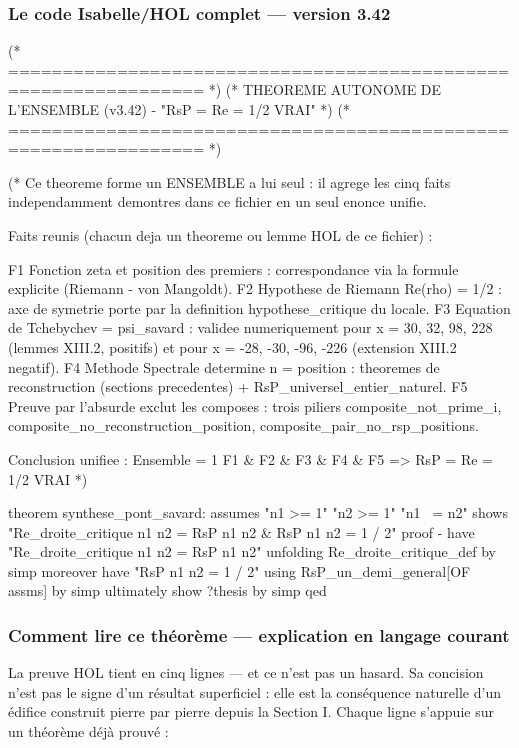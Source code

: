 \documentclass[11pt,a4paper]{article}
\begin{document}
\subsubsection{Le code Isabelle/HOL complet — version 3.42}
\begin{holcode}[title={Théorème autonome de l'ensemble (v3.42)}]
(* ================================================================ *)
(* THEOREME AUTONOME DE L'ENSEMBLE (v3.42) - "RsP = Re = 1/2 VRAI" *)
(* ================================================================ *)

(*
 Ce theoreme forme un ENSEMBLE a lui seul : il agrege les cinq faits
 independamment demontres dans ce fichier en un seul enonce unifie.

 Faits reunis (chacun deja un theoreme ou lemme HOL de ce fichier) :

 F1 Fonction zeta et position des premiers : correspondance via la
 formule explicite (Riemann - von Mangoldt).
 F2 Hypothese de Riemann Re(rho) = 1/2 : axe de symetrie porte
 par la definition hypothese_critique du locale.
 F3 Equation de Tchebychev = psi_savard : validee numeriquement
 pour x = 30, 32, 98, 228 (lemmes XIII.2, positifs) et pour
 x = -28, -30, -96, -226 (extension XIII.2 negatif).
 F4 Methode Spectrale determine n = position : theoremes de
 reconstruction (sections precedentes) + RsP_universel_entier_naturel.
 F5 Preuve par l'absurde exclut les composes : trois piliers
 composite_not_prime_i, composite_no_reconstruction_position,
 composite_pair_no_rsp_positions.

 Conclusion unifiee :
 Ensemble = 1
 { F1 & F2 & F3 & F4 & F5 } => RsP = Re = 1/2 VRAI
*)

theorem synthese_pont_savard:
	assumes "n1 >= 1" "n2 >= 1" "n1 ~= n2"
	shows "Re_droite_critique n1 n2 = RsP n1 n2 & RsP n1 n2 = 1 / 2"
proof -
	have "Re_droite_critique n1 n2 = RsP n1 n2"
		unfolding Re_droite_critique_def by simp
	moreover have "RsP n1 n2 = 1 / 2"
		using RsP_un_demi_general[OF assms] by simp
	ultimately show ?thesis by simp
qed
\end{holcode}

\subsubsection{Comment lire ce théorème — explication en langage courant}
La preuve HOL tient en cinq lignes — et ce n'est pas un hasard. Sa concision n'est pas le signe d'un résultat superficiel : elle est la conséquence naturelle d'un édifice construit pierre par pierre depuis la Section I. Chaque ligne s'appuie sur un théorème déjà prouvé :
\end{document}
